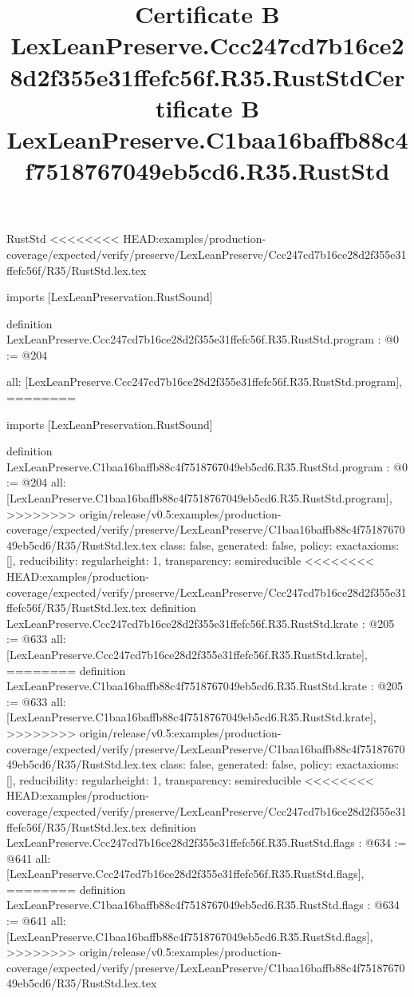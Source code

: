 \begin{lexlean}{RustStd}
<<<<<<<< HEAD:examples/production-coverage/expected/verify/preserve/LexLeanPreserve/Ccc247cd7b16ce28d2f355e31ffefc56f/R35/RustStd.lex.tex
\title{Certificate B LexLeanPreserve.Ccc247cd7b16ce28d2f355e31ffefc56f.R35.RustStd}
\begin{coremodule}
imports [LexLeanPreservation.RustSound]

definition LexLeanPreserve.Ccc247cd7b16ce28d2f355e31ffefc56f.R35.RustStd.program : @0 := @204 {
  all: [LexLeanPreserve.Ccc247cd7b16ce28d2f355e31ffefc56f.R35.RustStd.program],
========
\title{Certificate B LexLeanPreserve.C1baa16baffb88c4f7518767049eb5cd6.R35.RustStd}
\begin{coremodule}
imports [LexLeanPreservation.RustSound]

definition LexLeanPreserve.C1baa16baffb88c4f7518767049eb5cd6.R35.RustStd.program : @0 := @204 {
  all: [LexLeanPreserve.C1baa16baffb88c4f7518767049eb5cd6.R35.RustStd.program],
>>>>>>>> origin/release/v0.5:examples/production-coverage/expected/verify/preserve/LexLeanPreserve/C1baa16baffb88c4f7518767049eb5cd6/R35/RustStd.lex.tex
  class: false,
  generated: false,
  policy: exact{axioms: []},
  reducibility: regular{height: 1},
  transparency: semireducible
}
<<<<<<<< HEAD:examples/production-coverage/expected/verify/preserve/LexLeanPreserve/Ccc247cd7b16ce28d2f355e31ffefc56f/R35/RustStd.lex.tex
definition LexLeanPreserve.Ccc247cd7b16ce28d2f355e31ffefc56f.R35.RustStd.krate : @205 := @633 {
  all: [LexLeanPreserve.Ccc247cd7b16ce28d2f355e31ffefc56f.R35.RustStd.krate],
========
definition LexLeanPreserve.C1baa16baffb88c4f7518767049eb5cd6.R35.RustStd.krate : @205 := @633 {
  all: [LexLeanPreserve.C1baa16baffb88c4f7518767049eb5cd6.R35.RustStd.krate],
>>>>>>>> origin/release/v0.5:examples/production-coverage/expected/verify/preserve/LexLeanPreserve/C1baa16baffb88c4f7518767049eb5cd6/R35/RustStd.lex.tex
  class: false,
  generated: false,
  policy: exact{axioms: []},
  reducibility: regular{height: 1},
  transparency: semireducible
}
<<<<<<<< HEAD:examples/production-coverage/expected/verify/preserve/LexLeanPreserve/Ccc247cd7b16ce28d2f355e31ffefc56f/R35/RustStd.lex.tex
definition LexLeanPreserve.Ccc247cd7b16ce28d2f355e31ffefc56f.R35.RustStd.flags : @634 := @641 {
  all: [LexLeanPreserve.Ccc247cd7b16ce28d2f355e31ffefc56f.R35.RustStd.flags],
========
definition LexLeanPreserve.C1baa16baffb88c4f7518767049eb5cd6.R35.RustStd.flags : @634 := @641 {
  all: [LexLeanPreserve.C1baa16baffb88c4f7518767049eb5cd6.R35.RustStd.flags],
>>>>>>>> origin/release/v0.5:examples/production-coverage/expected/verify/preserve/LexLeanPreserve/C1baa16baffb88c4f7518767049eb5cd6/R35/RustStd.lex.tex
}}}
\end{coremodule}}
\end{coremodule}
\end{lexlean}
